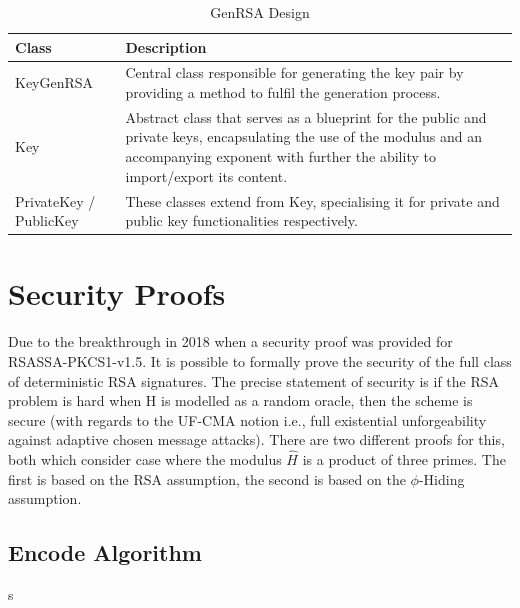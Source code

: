 \documentclass[]{final_report}
\theoremstyle{definition}
\begin{document}
\begin{table}[H]
    \centering
    \caption{GenRSA Design}
    \label{tab:actors_description}
    \begin{tabular}{|l|p{10cm}|}
    \hline
    \textbf{Class} & \textbf{Description} \\
    \hline
    KeyGenRSA & Central class responsible for generating the key pair by providing a method to fulfil the generation process. \\
    \hline
    Key & Abstract class that serves as a blueprint for the public and private keys, encapsulating the use of the modulus and an accompanying exponent with further the ability to import/export its content. \\
    \hline
    PrivateKey / PublicKey & These classes extend from Key, specialising it for private and public key functionalities respectively. \\
    \hline
    \end{tabular}
\end{table}

\chapter{Security Proofs}
Due to the breakthrough in 2018 \cite{jager2018security} when a security proof was provided for RSASSA-PKCS1-v1.5. It is possible to formally prove the security of the full class of deterministic RSA signatures. The precise statement of security is if the RSA problem is hard when H is modelled as a random oracle, then the scheme is secure (with regards to the UF-CMA notion i.e., full existential unforgeability against adaptive chosen message attacks). There are two different proofs for this, both which consider case where the modulus $\widehat{H}$ is a product of three primes. The first is based on the RSA assumption, the second is based on the $\phi$-Hiding assumption.


\section{Encode Algorithm}
s
\end{document}
